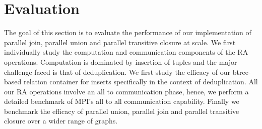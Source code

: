 

\section{Evaluation}
\label{sec:eval}

The goal of this section is to evaluate the performance of our implementation of parallel join, parallel union and parallel transitive closure at scale.
We first individually study the computation and communication components of the RA operations.
Computation is dominated by insertion of tuples and the major challenge faced is that of deduplication.
We first study the efficacy of our btree-based relation container for inserts specifically in the context of deduplication.
All our RA operations involve an all to communication phase, hence, we perform a detailed benchmark of MPI's all to all communication capability.
Finally we benchmark the efficacy of parallel union, parallel join and parallel transitive closure over a wider range of graphs.



